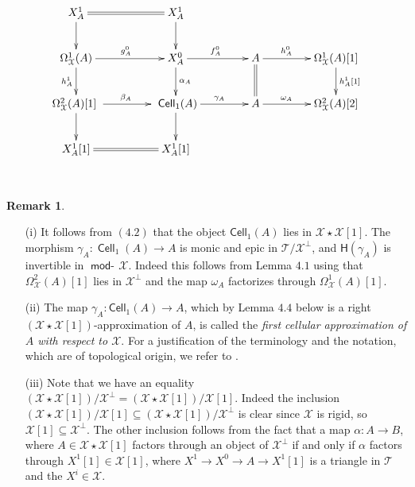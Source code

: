 \documentclass[oneside, a4paper,reqno]{amsart}
\numberwithin{equation}{section}
\theoremstyle{definition}
\newtheorem{rem}[thm]{Remark}
\begin{document}
\begin{equation}
\xymatrix@C=1.5cm{
                                 X^{1}_{A} \ar@{=}[r] \ar[d]  & X^{1}_{A}  \ar[d] &                \\
\Omega^{1}_{\mathcal X}(A) \ar[d]_{h^{1}_{A}} \ar[r]^{g^{0}_{A}} & X^{0}_{A} \ar[r]^{f^{0}_{A}} \ar[d]^{\alpha_{A}}           & A \ar@{=}[d]   \ar[r]^{h^{0}_{A} \ \ \ \ \ }   & \Omega^{1}_{\mathcal X}(A)[1] \ar[d]^{h^{1}_{A}[1]} \\
\Omega^{2}_{\mathcal X}(A)[1]   \ \ar[r]^{\beta_{A}} \ar[d]^{}            &   \ \mathsf{Cell}_{1}(A) \ar[r]^{\ \ \gamma_{A}} \ar[d]          & A  \ar[r]^{\omega_{A}\ \ \ \ \ }         & \Omega^{2}_{\mathcal X}(A)[2]              \\
                                 X^{1}_{A}[1] \ar@{=}[r]                      & X^{1}_{A}[1] &
}
\end{equation}

\, 
 
\begin{rem} \begin{enumerate}
\item[(i)] It follows from $(4.2)$ that the object $\mathsf{Cell}_{1}(A)$ lies in ${\mathcal X} \star {\mathcal X}[1]$. The morphism $\gamma_{A} \colon \operatorname*{{\mathsf{Cell}}}_{1}(A) {\longrightarrow} A$ is monic and epic in ${\mathcal T}/{\mathcal X}^{\bot}$, and $\mathsf{H}(\gamma_{A})$ is invertible in $\operatorname*{\mathsf{mod}-\!}{\mathcal X}$.  Indeed this follows from Lemma $4.1$ using that $\Omega^{2}_{\mathcal X}(A)[1]$ lies in ${\mathcal X}^{\bot}$ and  the map $\omega_{A}$ factorizes through $\Omega^{1}_{\mathcal X}(A)[1]$. 

\item[(ii)] The map $\gamma_{A} \colon \mathsf{Cell}_{1}(A) {\longrightarrow} A$, which by Lemma $4.4$ below is a right $({\mathcal X}\star{\mathcal X}[1])$-approximation of $A$, is called the {\em first cellular approximation of $A$ with respect to ${\mathcal X}$}.  For a justification of the terminology and the notation, which are of topological origin, we refer to \cite{B}. 

\item[(iii)] Note that we have an equality $({\mathcal X}\star {\mathcal X}[1])/{\mathcal X}^{\bot} = ({\mathcal X}\star {\mathcal X}[1])/{\mathcal X}[1]$.  Indeed the inclusion $({\mathcal X}\star {\mathcal X}[1])/{\mathcal X}[1] \subseteq ({\mathcal X}\star {\mathcal X}[1])/{\mathcal X}^{\bot}$ is clear since ${\mathcal X}$ is rigid, so ${\mathcal X}[1] \subseteq {\mathcal X}^{\bot}$. The other inclusion follows from the fact that a map $\alpha \colon A {\longrightarrow} B$, where $A \in {\mathcal X}\star {\mathcal X}[1]$ factors through an object of ${\mathcal X}^{\bot}$ if and only if $\alpha$ factors through $X^{1}[1] \in {\mathcal X}[1]$, where $X^{1} {\longrightarrow} X^{0} {\longrightarrow} A {\longrightarrow} X^{1}[1]$ is a triangle in ${\mathcal T}$ and the $X^{i} \in {\mathcal X}$. 
\end{enumerate}
\end{rem} 
\end{document}

